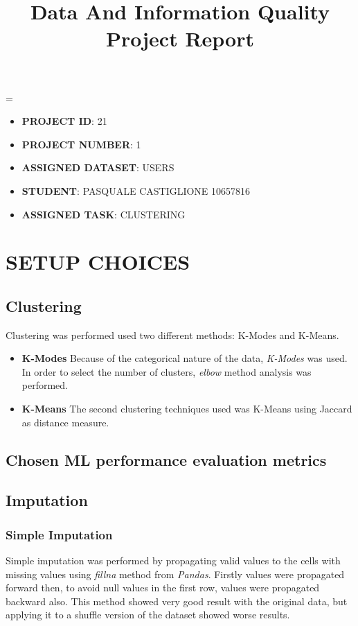 \documentclass{article}
\title{
	\vspace{4cm}
	\textbf{Data And Information Quality Project Report}\\
}
\author{}
\date{}
\newcommand{\justified}
{
	\tolerance=1
	\emergencystretch=\maxdimen
	\hyphenpenalty=10000
	\hbadness=10000
}
\begin{document}
\maketitle
\vfill
\justified
\begin{itemize}
	\item\textbf{PROJECT ID}: 21
	\item\textbf{PROJECT NUMBER}: 1
	\item\textbf{ASSIGNED DATASET}: USERS
	\item\textbf{STUDENT}: PASQUALE CASTIGLIONE 10657816
	\item\textbf{ASSIGNED TASK}: CLUSTERING
\end{itemize}

\newpage

\tableofcontents

\newpage



\section{SETUP CHOICES}
\subsection{Clustering}
Clustering was performed used two different methods: K-Modes and K-Means.
\begin{itemize}
\item\textbf{K-Modes}
Because of the categorical nature of the data, \emph{K-Modes} was used. In order to select the number of clusters, \emph{elbow} method analysis was performed.
\item\textbf{K-Means}
The second clustering techniques used was K-Means using Jaccard as distance measure.
\end{itemize}
\subsection{Chosen ML performance evaluation metrics}
\subsection{Imputation}
\subsubsection{Simple Imputation}
Simple imputation was performed by propagating valid values to the cells with missing values using \emph{fillna} method from \emph{Pandas}. Firstly values were propagated forward then, to avoid null values in the first row, values were propagated backward also. This method showed very good result with the original data, but applying it to a shuffle version of the dataset showed worse results.  
\end{document}

